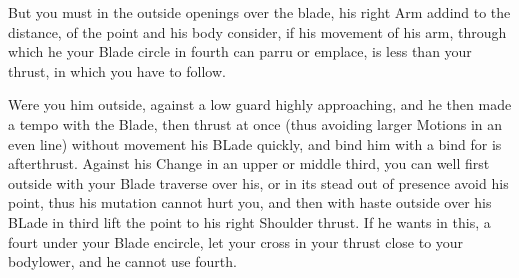
But you must in the outside openings over the blade, his right Arm
addind to the distance, of the point and his body consider, if his
movement of his arm, through which he your Blade circle in fourth can
parru or emplace, is less than your thrust, in which you have to follow.


Were you him outside, against a low guard highly approaching, and he
then made a tempo with the Blade, then thrust at once (thus avoiding
larger Motions in an even line) without movement his BLade quickly,
and bind him with a bind for is afterthrust. Against his Change in an
upper or middle third, you can well first outside with your Blade
traverse over his, or in its stead out of presence avoid his point,
thus his mutation cannot hurt you, and then with haste outside over
his BLade in third lift the point to his right Shoulder thrust. If he
wants in this, a fourt under your Blade encircle, let your cross in
your thrust close to your bodylower, and he cannot use fourth.


